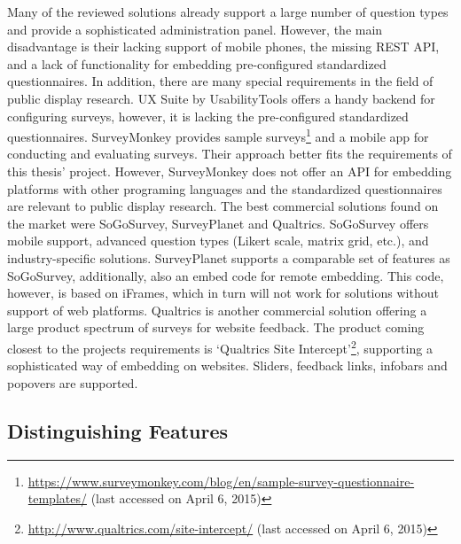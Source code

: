 	Many of the reviewed solutions already support a large number of question types and provide a sophisticated administration panel. However, the main disadvantage is their lacking support of mobile phones, the missing REST API, and a lack of functionality for embedding pre-configured standardized questionnaires. In addition, there are many special requirements in the field of public display research. 
	UX Suite by UsabilityTools offers a handy backend for configuring surveys, however, it is lacking the pre-configured standardized questionnaires. 
	SurveyMonkey provides sample surveys\footnote{\url{https://www.surveymonkey.com/blog/en/sample-survey-questionnaire-templates/} (last accessed on April 6, 2015)} and a mobile app for conducting and evaluating surveys. Their approach better fits the requirements of this thesis' project. However, SurveyMonkey does not offer an API for embedding platforms with other programing languages and the standardized questionnaires are relevant to public display research.
	The best commercial solutions found on the market were SoGoSurvey, SurveyPlanet and Qualtrics. 
		SoGoSurvey offers mobile support, advanced question types (Likert scale, matrix grid, etc.), and industry-specific solutions.
		SurveyPlanet supports a comparable set of features as SoGoSurvey, additionally, also an embed code for remote embedding. This code, however, is based on iFrames, which in turn will not work for solutions without support of web platforms.
		Qualtrics is another commercial solution offering a large product spectrum of surveys for website feedback. The product coming closest to the projects requirements is `Qualtrics Site Intercept'\footnote{\url{http://www.qualtrics.com/site-intercept/} (last accessed on April 6, 2015)}, supporting a sophisticated way of embedding on websites. Sliders, feedback links, infobars and popovers are supported.



	\subsection{Distinguishing Features}

